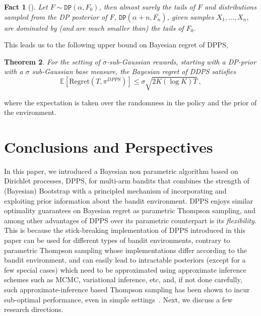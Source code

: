 \documentclass[10pt]{article}
\newtheorem{thm}{Theorem}
\newtheorem{fact}[thm]{Fact}
\def\E{\mathbb{E}}
\newcommand{\DP}{\texttt{DP}}
\begin{document}
\begin{fact}[\cite{doss1982tails}] Let $F \sim \DP(\alpha, F_{0})$, then almost surely the tails of $F$ and distributions sampled from the DP posterior of $F$, $\DP(\alpha + n, \overline{F_{n}})$, given samples $X_{1},. . ., X_{n}$, are dominated by (and are much smaller than) the tails of $F_{0}$.
\end{fact}

This leads us to the following upper bound on Bayesian regret of DPPS, 

\begin{thm}\label{thm:Bayesian-regret-DPPS}
For the setting of $\sigma$-sub-Gaussian rewards, starting with a DP-prior with a $\sigma$ sub-Gaussian base measure, the Bayesian regret of DDPS satisfies
\[\E\left[\mathrm{Regret}(T,\pi^{DPPS})\right] \le \sigma\sqrt{2{K}(\log{K})T}\,,\]
\end{thm}
where the expectation is taken over the randomness in the policy and the prior of the environment.  


\section{Conclusions and Perspectives}\label{sec:Discussions}


In this paper, we introduced a Bayesian non parametric algorithm based on Dirichlet processes, DPPS, for multi-arm bandits that combines the strength of (Bayesian) Bootstrap with a principled mechanism of incorporating and exploiting prior information about the bandit environment. DPPS enjoys similar optimality guarantees on Bayesian regret as parametric Thompson sampling, and among other advantages of DPPS over its parametric counterpart is its \textit{flexibility}. This is because the stick-breaking implementation of DPPS introduced in this paper can be used for different types of bandit environments, contrary to parametric Thompson sampling  whose implementations differ according to the bandit environment, and can easily lead to intractable posteriors (except for a few special cases) which need to be approximated using approximate inference schemes such as MCMC, variational inference, etc, and, if not done carefully, such approximate-inference based Thompson sampling has been shown to incur sub-optimal performance, even in simple settings~\citep{phan2019thompson}. Next, we discuss a few research directions. 
\end{document}
